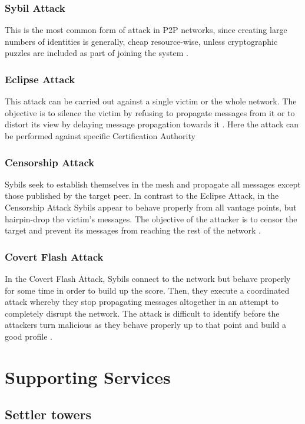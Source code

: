 \documentclass{article}
\begin{document}
\subsubsection{Sybil Attack}
This is the most common form of attack in P2P networks, since creating large numbers of identities is
generally, cheap resource-wise, unless cryptographic puzzles are included as part of joining the system \cite{GossipSub}.

\subsubsection{Eclipse Attack}
This attack can be carried out against a single victim or the whole network. The objective is to
silence the victim by refusing to propagate messages from it or to distort its view by delaying message propagation towards it \cite{GossipSub}.
Here the attack can be performed against specific Certification Authority

\subsubsection{Censorship Attack}
Sybils seek to establish themselves in the mesh and propagate all messages except those published by the target peer. In contrast to the Eclipse Attack, in the Censorship Attack Sybils appear to behave properly
from all vantage points, but hairpin-drop the victim's messages. The objective of the attacker is to censor the target and prevent its messages from reaching the rest of the network \cite{GossipSub}.

\subsubsection{Covert Flash Attack}
In the Covert Flash Attack, Sybils connect to the network but behave properly for some time in order to build up the score. Then, they execute a coordinated attack whereby they stop propagating messages altogether in an attempt to completely disrupt the network. The attack is difficult to identify before the attackers turn malicious as they behave properly up to that point and build a good profile \cite{GossipSub}.

\section{Supporting Services}

\subsection{Settler towers}
\end{document}
